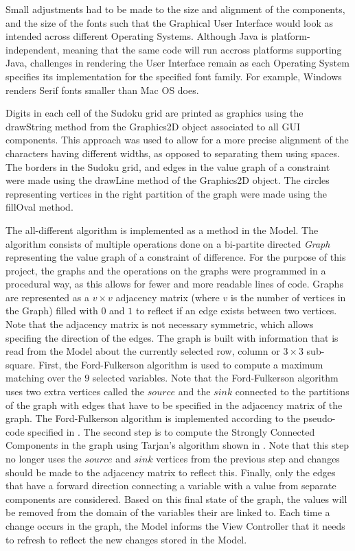 \documentclass{l4proj}
\begin{document}
\noindent Small adjustments had to be made to the size and alignment of the components, and the size of the fonts such that the Graphical User Interface would look as intended across different Operating Systems. Although Java is platform-independent, meaning that the same code will run accross platforms supporting Java, challenges in rendering the User Interface remain as each Operating System specifies its implementation for the specified font family. For example, Windows renders Serif fonts smaller than Mac OS does.

\noindent Digits in each cell of the Sudoku grid are printed as graphics using the drawString method from the Graphics2D object associated to all GUI components. This approach was used to allow for a more precise alignment of the characters having different widths, as opposed to separating them using spaces. The borders in the Sudoku grid, and edges in the value graph of a constraint were made using the drawLine method of the Graphics2D object. The circles representing vertices in the right partition of the graph were made using the fillOval method.

\noindent The all-different algorithm is implemented as a method in the Model. The algorithm consists of multiple operations done on a bi-partite directed \textit{Graph} representing the value graph of a constraint of difference. For the purpose of this project, the graphs and the operations on the graphs were programmed in a procedural way, as this allows for fewer and more readable lines of code. Graphs are represented as a $v \times v$ adjacency matrix (where $v$ is the number of vertices in the Graph) filled with $0$ and $1$ to reflect if an edge exists between two vertices. Note that the adjacency matrix is not necessary symmetric, which allows specifing the direction of the edges. The graph is built with information that is read from the Model about the currently selected row, column or $3 \times 3$ sub-square. First, the Ford-Fulkerson algorithm  \cite{ford1956maximal} is used to compute a maximum matching over the $9$ selected variables. Note that the Ford-Fulkerson algorithm uses two extra vertices called the $source$ and the $sink$ connected to the partitions of the graph with edges that have to be specified in the adjacency matrix of the graph. The Ford-Fulkerson algorithm is implemented according to the pseudo-code specified in . The second step is to compute the Strongly Connected Components in the graph using Tarjan's algorithm \cite{tarjan1972depth} shown in . Note that this step no longer uses the $source$ and $sink$ vertices from the previous step and changes should be made to the  adjacency matrix to reflect this. Finally, only the edges that have a forward direction connecting a variable with a value from separate components are considered. Based on this final state of the graph, the values will be removed from the domain of the variables their are linked to. Each time a change occurs in the graph, the Model informs the View Controller that it needs to refresh to reflect the new changes stored in the Model.
\end{document}
